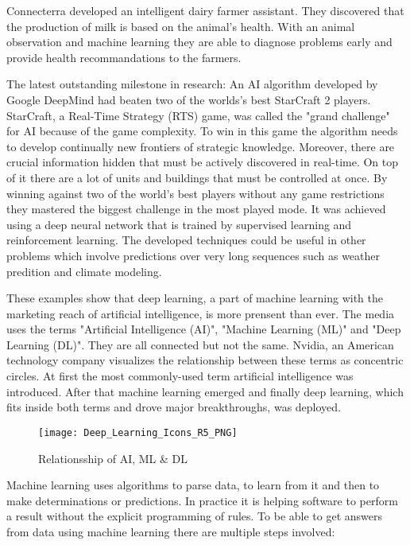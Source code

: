 Connecterra developed an intelligent dairy farmer assistant.
They discovered that the production of milk is based on the animal’s health.
With an animal observation and machine learning they are able to diagnose problems early and provide health recommandations to the farmers.
\cite{tensorflow-stories, connecterra-video, connecterra-web}

The latest outstanding milestone in research: An AI algorithm developed by Google DeepMind had beaten two of the worlds's best StarCraft 2 players.
StarCraft, a Real-Time Strategy (RTS) game, was called the "grand challenge" for AI because of the game complexity.
To win in this game the algorithm needs to develop continually new frontiers of strategic knowledge.
Moreover, there are crucial information hidden that must be actively discovered in real-time. On top of it there are a lot of units and buildings that must be controlled at once.
By winning against two of the world's best players without any game restrictions they mastered the biggest challenge in the most played mode.
It was achieved using a deep neural network that is trained by supervised learning and reinforcement learning.
The developed techniques could be useful in other problems which involve predictions over very long sequences such as weather predition and climate modeling.
\cite{alphastar}

These examples show that deep learning, a part of machine learning with the marketing reach of artificial intelligence, is more prensent than ever.
The media uses the terms "Artificial Intelligence (AI)", "Machine Learning (ML)" and "Deep Learning (DL)". They are all connected but not the same.
\hfill \break
Nvidia, an American technology company visualizes the relationship between these terms as concentric circles.
At first the most commonly-used term artificial intelligence was introduced.
After that machine learning emerged and finally deep learning, which fits inside both terms and drove major breakthroughs, was deployed.
\cite{nvidia-ai-explained}

\begin{figure}[H]
    \centering
    \texttt{[image: Deep\_Learning\_Icons\_R5\_PNG]}
    \caption{\cite[page 5]{nvidia-ai-explained} Relationsship of AI, ML \& DL}
    \label{fig:ai_ml_dl_termns}
\end{figure}

Machine learning uses algorithms to parse data, to learn from it and then to make determinations or predictions.
In practice it is helping software to perform a result without the explicit programming of rules.
To be able to get answers from data using machine learning there are multiple steps involved:
\cite{nvidia-ai-explained, tensorflow-about}

